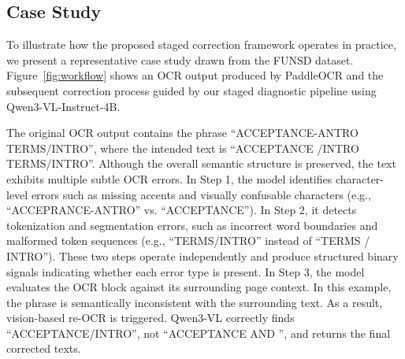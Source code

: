\documentclass[11pt]{article}
\begin{document}
\subsection{Case Study}

To illustrate how the proposed staged correction framework operates in practice, we present a representative case study drawn from the FUNSD dataset. Figure~\ref{fig:workflow} shows an OCR output produced by PaddleOCR and the subsequent correction process guided by our staged diagnostic pipeline using Qwen3-VL-Instruct-4B.

The original OCR output contains the phrase ``ACCEPTANCE-ANTRO TERMS/INTRO'', where the intended text is ``ACCEPTANCE /INTRO TERMS/INTRO''. Although the overall semantic structure is preserved, the text exhibits multiple subtle OCR errors.
In Step 1, the model identifies character-level errors such as missing accents and visually confusable characters (e.g., ``ACCEPRANCE-ANTRO'' vs. ``ACCEPTANCE''). 
In Step 2, it detects tokenization and segmentation errors, such as incorrect word boundaries and malformed token sequences (e.g., ``TERMS/INTRO'' instead of ``TERMS / INTRO''). These two steps operate independently and produce structured binary signals indicating whether each error type is present.
In Step 3, the model evaluates the OCR block against its surrounding page context. In this example, the phrase is semantically inconsistent with the surrounding text. As a result, vision-based re-OCR is triggered. Qwen3-VL correctly finds ``ACCEPTANCE/INTRO'', not ``ACCEPTANCE AND '', and returns the final corrected texts.
\end{document}
